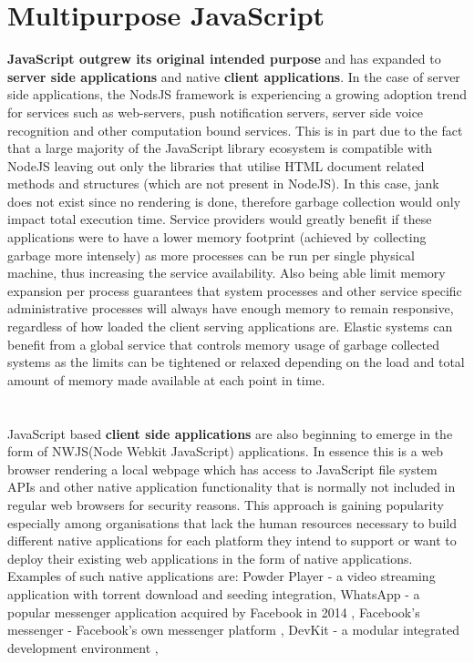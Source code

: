 \documentclass{l4proj}
\begin{document}
\section{Multipurpose JavaScript}
\hspace*{3em} \textbf{JavaScript outgrew its original intended purpose} and has expanded to \textbf{server side applications} and native \textbf{client applications}. In the case of server side applications, the NodsJS framework is experiencing a growing adoption trend for services such as web-servers, push notification servers, server side voice recognition and other computation bound services. This is in part due to the fact that a large majority of the JavaScript library ecosystem is compatible with NodeJS leaving out only the libraries that utilise HTML document related methods and structures (which are not present in NodeJS). In this case, jank does not exist since no rendering is done, therefore garbage collection would only impact total execution time. Service providers would greatly benefit if these applications were to have a lower memory footprint (achieved by collecting garbage more intensely) as more processes can be run per single physical machine, thus increasing the service availability. Also being able limit memory expansion per process guarantees that system processes and other service specific administrative processes will always have enough memory to remain responsive, regardless of how loaded the client serving applications are. Elastic systems can benefit from a global service that controls memory usage of garbage collected systems as the limits can be tightened or relaxed depending on the load and total amount of memory made available at each point in time.\\%
\\\\
\hspace*{3em} JavaScript based \textbf{client side applications} are also beginning to emerge in the form of NWJS(Node Webkit JavaScript) applications. In essence this is a web browser rendering a local webpage which has access to JavaScript file system APIs and other native application functionality that is normally not included in regular web browsers for security reasons. This approach is gaining popularity especially among organisations that lack the human resources necessary to build different native applications for each platform they intend to support or want to deploy their existing web applications in the form of native applications. 
Examples of such native applications are: Powder Player - a video streaming application with torrent download and seeding integration\cite{powderplayer}, WhatsApp - a popular messenger application acquired by Facebook in 2014 \cite{whatsap}, Facebook’s messenger - Facebook's own messenger platform \cite{messenger}, DevKit - a modular integrated development environment \cite{devkit},
\end{document}

